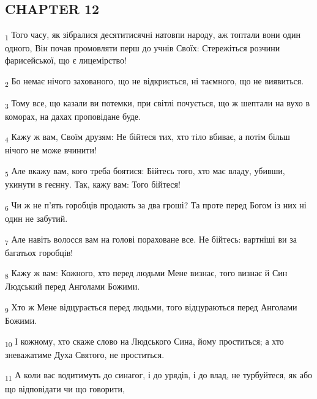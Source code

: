 \subsection{CHAPTER 12}
\begin{tcolorbox}
\textsubscript{1} Того часу, як зібралися десятитисячні натовпи народу, аж топтали вони один одного, Він почав промовляти перш до учнів Своїх: Стережіться розчини фарисейської, що є лицемірство!
\end{tcolorbox}
\begin{tcolorbox}
\textsubscript{2} Бо немає нічого захованого, що не відкриється, ні таємного, що не виявиться.
\end{tcolorbox}
\begin{tcolorbox}
\textsubscript{3} Тому все, що казали ви потемки, при світлі почується, що ж шептали на вухо в коморах, на дахах проповідане буде.
\end{tcolorbox}
\begin{tcolorbox}
\textsubscript{4} Кажу ж вам, Своїм друзям: Не бійтеся тих, хто тіло вбиває, а потім більш нічого не може вчинити!
\end{tcolorbox}
\begin{tcolorbox}
\textsubscript{5} Але вкажу вам, кого треба боятися: Бійтесь того, хто має владу, убивши, укинути в геєнну. Так, кажу вам: Того бійтеся!
\end{tcolorbox}
\begin{tcolorbox}
\textsubscript{6} Чи ж не п'ять горобців продають за два гроші? Та проте перед Богом із них ні один не забутий.
\end{tcolorbox}
\begin{tcolorbox}
\textsubscript{7} Але навіть волосся вам на голові пораховане все. Не бійтесь: вартніші ви за багатьох горобців!
\end{tcolorbox}
\begin{tcolorbox}
\textsubscript{8} Кажу ж вам: Кожного, хто перед людьми Мене визнає, того визнає й Син Людський перед Анголами Божими.
\end{tcolorbox}
\begin{tcolorbox}
\textsubscript{9} Хто ж Мене відцурається перед людьми, того відцураються перед Анголами Божими.
\end{tcolorbox}
\begin{tcolorbox}
\textsubscript{10} І кожному, хто скаже слово на Людського Сина, йому проститься; а хто зневажатиме Духа Святого, не проститься.
\end{tcolorbox}
\begin{tcolorbox}
\textsubscript{11} А коли вас водитимуть до синагог, і до урядів, і до влад, не турбуйтеся, як або що відповідати чи що говорити,
\end{tcolorbox}
